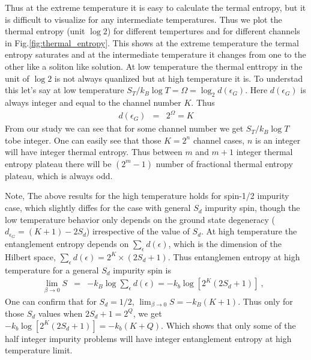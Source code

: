 \documentclass[reprint,prb,superscriptaddress]{revtex4-2}
\begin{document}
Thus at the extreme temperature it is easy to calculate the termal entropy, but it is difficult to visualize for any intermediate temperatures. Thus we plot the thermal entropy (unit $\log 2$) for different tempertures and for different channels in Fig.\ref{fig:thermal_entropy}. This shows at the extreme temperature the termal entropy saturates and at the intermediate temperature it changes from one to the other like a soliton like solution. At low temperature the thermal enttropy in the unit of $\log 2$ is not always quanlized but at high temperature it is. To understad this let's say at low temperature $S_T/k_B\log T=\Omega=\log_2 d(\epsilon_{G})$. Here $d(\epsilon_{G})$ is always integer and equal to the channel number $K$. Thus 
\begin{eqnarray}
d(\epsilon_{G}) &=& 2^{\Omega}=K
\end{eqnarray}
From our study we can see that for some channel number we get $S_T/k_B\log T$ tobe integer. One can easily see that those $K=2^n$ channel cases, $n$ is an integer will have integer thermal entropy. Thus between $m$ and $m+1$ integer thermal entropy plateau there will be $(2^m-1)$ number of fractional thermal entropy plateau, which is always odd.

\par Note, The above results for the high temperature holds for spin-1/2 impurity case, which slightly diffes for the case with general $S_d$ impurity spin, though the low temperature behavior only depends on the ground state degeneracy ($d_{\epsilon_G}=(K+1)-2S_d$) irrespective of the value of $S_d$. At high temperature the entanglement entropy depends on $\sum_{\epsilon} d(\epsilon)$, which is the dimension of the Hilbert space, $\sum_{\epsilon} d(\epsilon)=2^K\times (2S_d+1)$. Thus entanglemen entropy at high temperature for a general $S_d$ impurity spin is
\begin{eqnarray}
\lim_{\beta\rightarrow 0} S &=& -k_B \log \sum_{\epsilon} d(\epsilon)= -k_b \log [2^K (2S_d+1)]~,~~~
\end{eqnarray}
One can confirm that for $S_d=1/2$, $\lim_{\beta\rightarrow 0} S=-k_B(K+1)$. Thus only for those $S_d$ values when $2S_d+1=2^Q$, we get $-k_b \log [2^K (2S_d+1)]=-k_b (K+Q)$. Which shows that only some of the half integer impurity problems will have integer entanglement entropy at high temperature limit.
\end{document}
